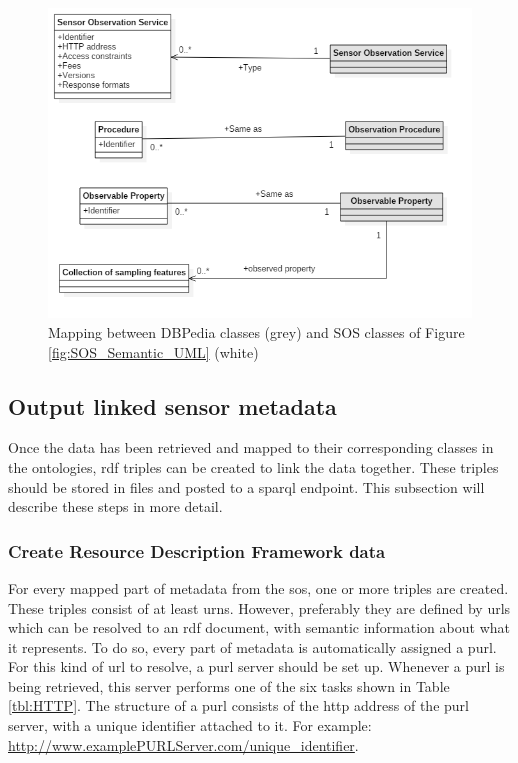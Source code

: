  \begin{figure}
 	\centering
 	\includegraphics[width=0.9\linewidth]{UML/DBPedia_to_SKB.PNG}
 	\caption{Mapping between DBPedia classes (grey) and SOS classes of Figure \ref{fig:SOS_Semantic_UML} (white)}
 	\label{fig:SOS_DBPedia}
 \end{figure}

\subsection{Output linked sensor metadata}
\label{par:publishLD}

Once the data has been retrieved and mapped to their corresponding classes in the ontologies, \ac{rdf} triples can be created to link the data together. These triples should be stored in files and posted to a \ac{sparql} endpoint. This subsection will describe these steps in more detail.


\subsubsection{Create Resource Description Framework data}
\label{par:createRDF}
For every mapped part of metadata from the \ac{sos}, one or more triples are created. These triples consist of at least \aclp{urn}. However, preferably they are defined by \aclp{url} which can be resolved to an \ac{rdf} document, with semantic information about what it represents. To do so, every part of metadata is automatically assigned a \acf{purl}. For this kind of \ac{url} to resolve, a \ac{purl} server should be set up. Whenever a \ac{purl} is being retrieved, this server performs one of the six tasks shown in Table \ref{tbl:HTTP}. The structure of a \ac{purl} consists of the \ac{http} address of the \ac{purl} server, with a unique identifier attached to it. For example: \url{http://www.examplePURLServer.com/unique\_identifier}. 

